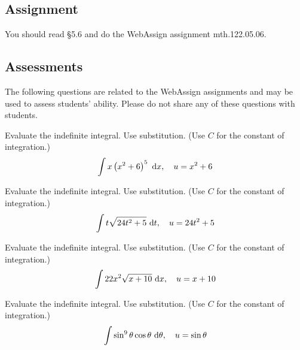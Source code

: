 \documentclass[12pt,addpoints, answers, fleqn]{exam}
\begin{document}
\subsection{Assignment}
You should read \S  5.6 and do the WebAssign assignment mth.122.05.06.
\vfill
\pagebreak
\begin{teacher}
\subsection{Assessments}
The following questions are related to the WebAssign assignments and may be used to assess students' ability. Please do not share any of these questions with students.
\begin{questions}		
\question 	%

Evaluate the indefinite integral. Use substitution. (Use $C$ for the constant of integration.)
\[
\int x \left( x^2 + 6 \right)^5 \ {\rm{d}} x, \quad u = x^2 +6
\]

\begin{solution}
\end{solution}

\question 	%

Evaluate the indefinite integral. Use substitution. (Use $C$ for the constant of integration.)
\[
\int t \sqrt{24t^2+5} \ {\rm{d}} t, \quad u = 24 t^2 +5
\]

\begin{solution}
\end{solution}
\question 	%

Evaluate the indefinite integral. Use substitution. (Use $C$ for the constant of integration.)
\[
\int 22x^2 \sqrt{x+10} \ {\rm{d}} x, \quad u = x + 10
\]
\begin{solution}
\end{solution}

\question 	%

Evaluate the indefinite integral. Use substitution. (Use $C$ for the constant of integration.)
\[
\int \sin^9 \theta \cos \theta \ {\rm{d}} \theta, \quad u = \sin \theta
\]
\begin{solution}
\end{solution}

\question 	%


\end{questions}
\end{teacher}
\end{document}

